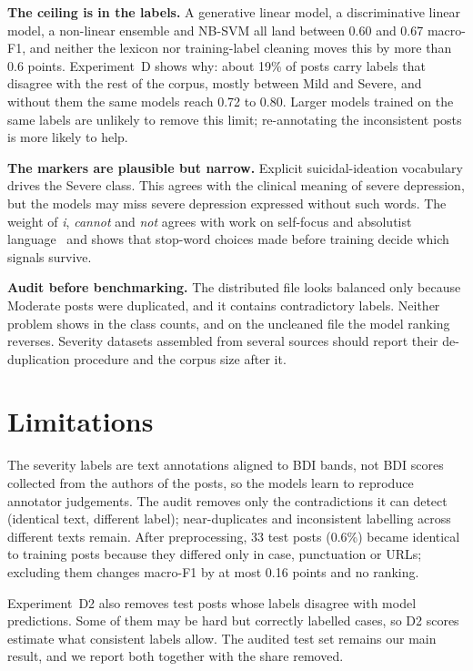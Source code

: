 \documentclass[conference]{IEEEtran}
\begin{document}
\textbf{The ceiling is in the labels.} A generative linear model, a discriminative linear model, a non-linear ensemble and NB-SVM all land between 0.60 and 0.67 macro-F1, and neither the lexicon nor training-label cleaning moves this by more than 0.6 points. Experiment~D shows why: about 19\% of posts carry labels that disagree with the rest of the corpus, mostly between Mild and Severe, and without them the same models reach 0.72 to 0.80. Larger models trained on the same labels are unlikely to remove this limit; re-annotating the inconsistent posts is more likely to help.

\textbf{The markers are plausible but narrow.} Explicit suicidal-ideation vocabulary drives the Severe class. This agrees with the clinical meaning of severe depression, but the models may miss severe depression expressed without such words. The weight of \textit{i}, \textit{cannot} and \textit{not} agrees with work on self-focus and absolutist language~\cite{rude2004language,almosaiwi2018absolute} and shows that stop-word choices made before training decide which signals survive.

\textbf{Audit before benchmarking.} The distributed file looks balanced only because Moderate posts were duplicated, and it contains contradictory labels. Neither problem shows in the class counts, and on the uncleaned file the model ranking reverses. Severity datasets assembled from several sources should report their de-duplication procedure and the corpus size after it.

\section{Limitations}\label{sec:limits}

The severity labels are text annotations aligned to BDI bands, not BDI scores collected from the authors of the posts, so the models learn to reproduce annotator judgements. The audit removes only the contradictions it can detect (identical text, different label); near-duplicates and inconsistent labelling across different texts remain. After preprocessing, 33 test posts (0.6\%) became identical to training posts because they differed only in case, punctuation or URLs; excluding them changes macro-F1 by at most 0.16 points and no ranking.

Experiment~D2 also removes test posts whose labels disagree with model predictions. Some of them may be hard but correctly labelled cases, so D2 scores estimate what consistent labels allow. The audited test set remains our main result, and we report both together with the share removed.
\end{document}
